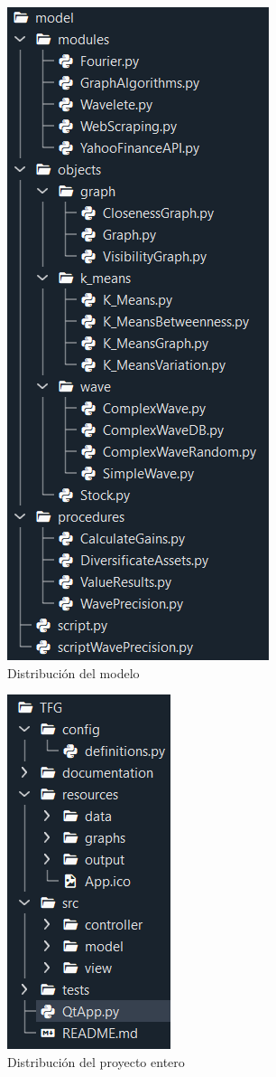 \documentclass[12pt,a4paper]{article}
\begin{document}
\begin{figure}[H]
\centering
  \centering
  \includegraphics[width=0.5\linewidth]{carpetas modelo}
\caption{Distribución del modelo}
\label{fig:subrgrafo}
\end{figure}
\begin{figure}[H]
\centering
  \centering
  \includegraphics[width=0.5\linewidth]{carpetas proyecto}
\caption{Distribución del proyecto entero}
\label{fig:subrgrafo}
\end{figure}
\pagebreak
	
\end{document}
